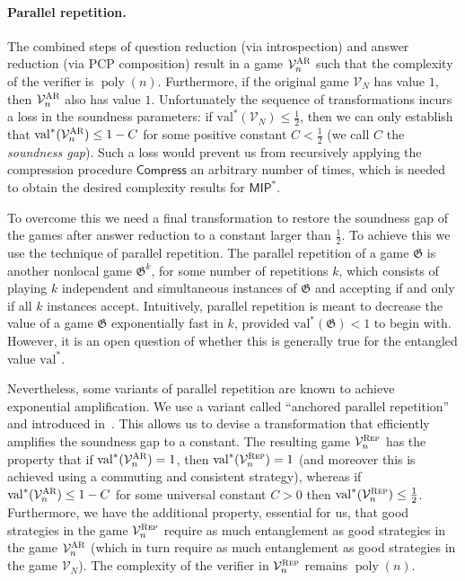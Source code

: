 \documentclass[11pt]{article}
\theoremstyle{definition}
\DeclareMathOperator{\poly}{poly}
\newcommand{\val}{\ensuremath{\mathrm{val}}}
\newcommand{\game}{\mathfrak{G}}
\newcommand{\verifier}{\mathcal{V}}
\newcommand{\gamestyle}[1]{\ensuremath{\textsc{#1}}\xspace}
\newcommand{\ar}{\gamestyle{AR}}
\newcommand{\class}[1]{\ensuremath{\mathsf{#1}}\xspace}
\newcommand{\MIP}{\class{MIP}} %
\newcommand{\tmstyle}[1]{\ensuremath{\mathsf{#1}}}
\newcommand{\Compress}{\tmstyle{Compress}}
\newcommand{\rep}{\gamestyle{Rep}}
\begin{document}
\paragraph{Parallel repetition.}
The combined steps of question reduction (via introspection) and answer reduction (via PCP composition) result in a game $\verifier_n^\ar$ such that the complexity of the verifier is $\poly(n)$. Furthermore, if the original game $\verifier_N$ has value $1$, then $\verifier_n^\ar$ also has value $1$. Unfortunately the sequence of transformations incurs a loss in the soundness parameters: if $\val^*(\verifier_N) \leq \frac{1}{2}$, then we can only establish that $\val^*(\verifier^\ar_n) \leq 1 - C$ for some positive constant $C < \frac{1}{2}$ (we call $C$ the \emph{soundness gap}). Such a loss would prevent us from recursively applying the compression procedure $\Compress$ an arbitrary number of times, which is needed to obtain the desired complexity results for $\MIP^*$. 

To overcome this we need a final transformation to restore the soundness gap of the games after answer reduction to a constant larger than $\frac{1}{2}$. To achieve this we use the technique of {parallel repetition}. The parallel repetition of a game $\game$ is another nonlocal game $\game^k$, for some number of repetitions $k$, which consists of playing $k$ independent and simultaneous instances of $\game$ and accepting if and only if all $k$ instances accept. Intuitively, parallel repetition is meant to decrease the value of a game $\game$ exponentially fast in $k$, provided $\val^*(\game) < 1$ to begin with. However, it is an open question of whether this is generally true for the entangled value $\val^*$. 

Nevertheless, some variants of parallel repetition are known to achieve exponential amplification. We use  a variant  called ``anchored parallel repetition'' and introduced in~\cite{bavarian2017hardness}. This allows us to devise a transformation that efficiently amplifies the soundness gap to a constant. The resulting game $\verifier^\rep_n$ has the property that if $\val^*(\verifier^\ar_n) = 1$, then $\val^*(\verifier^\rep_n) = 1$ (and moreover this is achieved using a commuting and consistent strategy), whereas if $\val^*(\verifier^\ar_n) \leq 1 - C$ for some universal constant $C > 0$ then $\val^*(\verifier^\rep_n) \leq \frac{1}{2}$. Furthermore, we have the additional property, essential for us, that good strategies in the game $\verifier^\rep_n$ require as much entanglement as good strategies in the game $\verifier^\ar_n$ (which in turn require as much entanglement as good strategies in the game $\verifier_N$). The complexity of the verifier in $\verifier^\rep_n$ remains $\poly(n)$.
\end{document}
